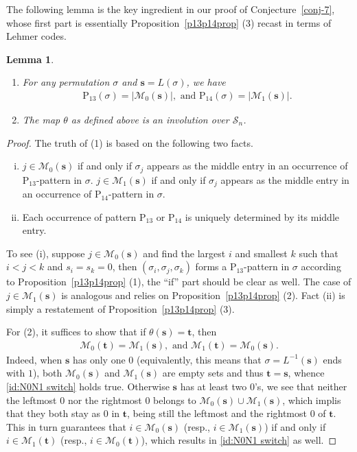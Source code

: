 \documentclass[12pt,reqno]{article}
\numberwithin{equation}{section}
\theoremstyle{plain}
\newtheorem{lemma}[theorem]{Lemma}
\theoremstyle{definition}
\def\rP{\mathrm{P}}
\def\cS{\mathcal{S}}
\def\cN{\mathcal{M}}
\def\bs{\mathbf{s}}
\def\bt{\mathbf{t}}
\begin{document}
The following lemma is the key ingredient in our proof of Conjecture~\ref{conj-7}, whose first part is essentially Proposition~\ref{p13p14prop} (3) recast in terms of Lehmer codes.
\begin{lemma}\label{lem:key for conj-7}
\begin{enumerate}
	\item For any permutation $\sigma$ and $\bs=L(\sigma)$, we have 
	\begin{align}\label{id:P and M}
	\rP_{13}(\sigma)=|\cN_0(\bs)|, \text{ and } \rP_{14}(\sigma)=|\cN_1(\bs)|.
	\end{align}
	\item The map $\theta$ as defined above is an involution over $\cS_n$.
\end{enumerate}
\end{lemma}
\begin{proof}
The truth of (1) is based on the following two facts.
\begin{enumerate}[(i)]
	\item $j\in\cN_0(\bs)$ if and only if $\sigma_j$ appears as the middle entry in an occurrence of $\rP_{13}$-pattern in $\sigma$. $j\in\cN_1(\bs)$ if and only if $\sigma_j$ appears as the middle entry in an occurrence of $\rP_{14}$-pattern in $\sigma$.
	\item Each occurrence of pattern $\rP_{13}$ or $\rP_{14}$ is uniquely determined by its middle entry.
\end{enumerate}
To see (i), suppose $j\in\cN_0(\bs)$ and find the largest $i$ and smallest $k$ such that $i<j<k$ and $s_i=s_k=0$, then $(\sigma_i,\sigma_j,\sigma_k)$ forms a $\rP_{13}$-pattern in $\sigma$ according to Proposition~\ref{p13p14prop} (1), the ``if'' part should be clear as well. The case of $j\in\cN_1(\bs)$ is analogous and relies on Proposition~\ref{p13p14prop} (2). Fact (ii) is simply a restatement of Proposition~\ref{p13p14prop} (3).

For (2), it suffices to show that if $\theta(\bs)=\bt$, then
\begin{align}\label{id:N0N1 switch}
\cN_0(\bt)=\cN_1(\bs), \text{ and } \cN_1(\bt)=\cN_0(\bs).
\end{align}
Indeed, when $\bs$ has only one $0$ (equivalently, this means that $\sigma=L^{-1}(\bs)$ ends with $1$), both $\cN_0(\bs)$ and $\cN_1(\bs)$ are empty sets and thus $\bt=\bs$, whence \eqref{id:N0N1 switch} holds true. Otherwise $\bs$ has at least two $0$'s, we see that neither the leftmost $0$ nor the rightmost $0$ belongs to $\cN_0(\bs)\cup \cN_1(\bs)$, which implis that they both stay as $0$ in $\bt$, being still the leftmost and the rightmost $0$ of $\bt$. This in turn guarantees that $i\in\cN_0(\bs)$ (resp., $i\in\cN_1(\bs)$) if and only if $i\in\cN_1(\bt)$ (resp., $i\in\cN_0(\bt)$), which results in \eqref{id:N0N1 switch} as well.
\end{proof}
\end{document}
